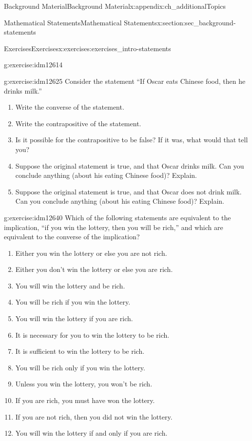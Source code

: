 \documentclass[oneside,10pt,]{book}
\numberwithin{equation}{chapter}
\begin{document}
\begin{appendixptx}{Background Material}{}{Background Material}{}{}{x:appendix:ch_additionalTopics}
\begin{sectionptx}{Mathematical Statements}{}{Mathematical Statements}{}{}{x:section:sec_background-statements}
\begin{exercises-subsection}{Exercises}{}{Exercises}{}{}{x:exercises:exercises_intro-statements}
\begin{divisionexercise}{3}{}{}{g:exercise:idm12614}
\begin{enumerate}[label=(\alph*)]
\end{enumerate}
\end{divisionexercise}%
\begin{divisionexercise}{4}{}{}{g:exercise:idm12625}%
Consider the statement ``If Oscar eats Chinese food, then he drinks milk.''%
%
\begin{enumerate}[label=(\alph*)]
\item{}Write the converse of the statement.%
\item{}Write the contrapositive of the statement.%
\item{}Is it possible for the contrapositive to be false? If it was, what would that tell you?%
\item{}Suppose the original statement is true, and that Oscar drinks milk. Can you conclude anything (about his eating Chinese food)? Explain.%
\item{}Suppose the original statement is true, and that Oscar does not drink milk. Can you conclude anything (about his eating Chinese food)? Explain.%
\end{enumerate}
\end{divisionexercise}%
\begin{divisionexercise}{5}{}{}{g:exercise:idm12640}%
Which of the following statements are equivalent to the implication, ``if you win the lottery, then you will be rich,'' and which are equivalent to the converse of the implication?%
%
\begin{enumerate}[label=(\alph*)]
\item{}Either you win the lottery or else you are not rich.%
\item{}Either you don't win the lottery or else you are rich.%
\item{}You will win the lottery and be rich.%
\item{}You will be rich if you win the lottery.%
\item{}You will win the lottery if you are rich.%
\item{}It is necessary for you to win the lottery to be rich.%
\item{}It is sufficient to win the lottery to be rich.%
\item{}You will be rich only if you win the lottery.%
\item{}Unless you win the lottery, you won't be rich.%
\item{}If you are rich, you must have won the lottery.%
\item{}If you are not rich, then you did not win the lottery.%
\item{}You will win the lottery if and only if you are rich.%

\end{enumerate}
\end{divisionexercise}
\end{exercises-subsection}
\end{sectionptx}
\end{appendixptx}
\end{document}
